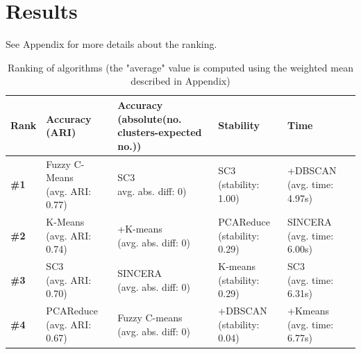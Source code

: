\documentclass{report}
\begin{document}
{\section{Results}

See Appendix for more details about the ranking.

\begin{table}[H]
\centering
\caption{Ranking of algorithms (the "average" value is computed using the weighted mean described in Appendix)}
\begin{tabular}{| l | l | l | l | l |}
\hline
\parbox[c]{2cm}{\textbf{Rank}} & 
\parbox[c]{3cm}{\textbf{Accuracy\\(ARI)}} & 
\parbox[c]{3cm}{\textbf{Accuracy\\(absolute(no.\\clusters-expected no.))\\}} & 
\parbox[c]{3cm}{\textbf{Stability}} &
\parbox[c]{3cm}{\textbf{Time}}\\
\hline
\parbox[c]{2cm}{\textbf{\#1}} & 
\parbox[c]{3cm}{Fuzzy C-Means\\(avg. ARI: 0.77)} & 
\parbox[c]{3cm}{SC3\\avg. abs. diff: 0)} & 
\parbox[c]{3cm}{SC3\\(stability: 1.00)} &
\parbox[c]{3cm}{+DBSCAN\\(avg. time: 4.97s)}\\
\hline
\parbox[c]{2cm}{\textbf{\#2}} & 
\parbox[c]{3cm}{K-Means\\(avg. ARI: 0.74)} & 
\parbox[c]{3cm}{+K-means\\(avg. abs. diff: 0)} & 
\parbox[c]{3cm}{PCAReduce\\(stability: 0.29)} &
\parbox[c]{3cm}{SINCERA\\(avg. time: 6.00s)}\\
\hline
\parbox[c]{2cm}{\textbf{\#3}} & 
\parbox[c]{3cm}{SC3\\(avg. ARI: 0.70)} & 
\parbox[c]{3cm}{SINCERA\\(avg. abs. diff: 0)} & 
\parbox[c]{3cm}{K-means\\(stability: 0.29)} &
\parbox[c]{3cm}{SC3\\(avg. time: 6.31s)}\\
\hline
\parbox[c]{2cm}{\textbf{\#4}} & 
\parbox[c]{3cm}{PCAReduce\\(avg. ARI: 0.67)} & 
\parbox[c]{3cm}{Fuzzy C-means\\(avg. abs. diff: 0)} & 
\parbox[c]{3cm}{+DBSCAN\\(stability: 0.04)} &
\parbox[c]{3cm}{+Kmeans\\(avg. time: 6.77s)}\\

\end{tabular}
\end{table}}
\end{document}
